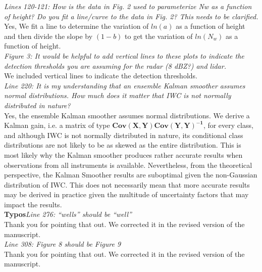 \documentclass[12pt]{article}
\begin{document}
\textit{Lines 120-121: How is the data in Fig. 2 used to parameterize Nw as a function of height? Do you fit a line/curve to the 
data in Fig. 2? This needs to be clarified.}\\
\newline
Yes, We fit a line to determine the variation of $ln(a)$ as a function of height and then divide the slope by $(1-b)$ to get the variation of
$ln(N_w)$ as a function of height.\\
\newline
\textit{Figure 3: It would be helpful to add vertical lines to these plots to indicate the detection thresholds you are 
assuming for the radar (8 dBZ?) and lidar.}\\
\newline
We included vertical lines to indicate the detection thresholds.\\
\newline
\textit{Line 220: It is my understanding that an ensemble Kalman smoother assumes normal distributions. How much does it matter 
that IWC is not normally distributed in nature?}\\
\newline
Yes, the ensemble Kalman smoother assumes normal distributions.  We derive a Kalman gain, i.e. a matrix of type $\mathbf{Cov(X,Y) Cov(Y,Y)^{-1}}$, 
for every class, and although IWC is not normally distributed in nature, its conditional class distributions are not likely to be as skewed 
as the entire distribution.
This is most likely why the Kalman smoother produces rather accurate results when observations from all instruments is available.  
Nevertheless, from the theoretical perspective, the Kalman Smoother results are suboptimal given the non-Gaussian distribution of IWC.  This
does not necessarily mean that more accurate results may be derived in practice given the multitude of uncertainty factors that may
impact the results.\\
\newline
\textbf{Typos}\textit{Line 276: “wells” should be “well”}\\
\newline
Thank you for pointing that out. We corrected it in the revised version of the manuscript.\\
\newline
\textit{Line 308: Figure 8 should be Figure 9}\\
\newline
Thank you for pointing that out. We corrected it in the revised version of the manuscript.\\
\end{document}
